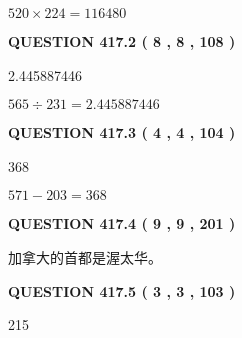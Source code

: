 \documentclass{ctexart}
\begin{document}
$ %
520 \times  %
224=   %
116480$
 
 
  
\vspace{0.2in}
  
{\textbf{\Large{QUESTION
417.2 
 ( 8 , 8 , 108 )
}}}
  
  
 
 
\noindent{}

2.445887446
 
 
 
 
\noindent{}

$ %
565 \div  %
231=   %
2.445887446$
 
 
  
\vspace{0.2in}
  
{\textbf{\Large{QUESTION
417.3 
 ( 4 , 4 , 104 )
}}}
  
  
 
 
\noindent{}

368
 
 
 
 
\noindent{}

$ %
571 -  %
203=   %
368$
 
 
  
\vspace{0.2in}
  
{\textbf{\Large{QUESTION
417.4 
 ( 9 , 9 , 201 )
}}}
  
  
 
 
\noindent{}
 
 
加拿大的首都是渥太华。
 
 
 
 
  
\vspace{0.2in}
  
{\textbf{\Large{QUESTION
417.5 
 ( 3 , 3 , 103 )
}}}
  
  
 
 
\noindent{}

215
 
 
 
\end{document}
